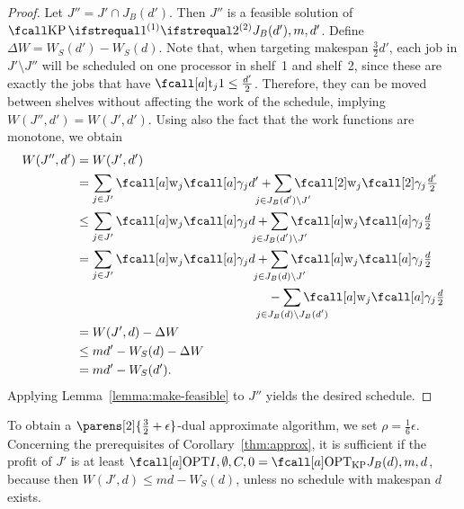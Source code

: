 \begin{proof}
  Let $J'' = J' \cap J_B(d')$.
  Then $J''$ is a feasible solution of $\KP{J_B(d')}{m,d'}$.
  Define $\Delta W = W_S(d') - W_S(d)$.
  Note that, when targeting makespan $\frac{3}{2}d'$,
  each job in $J' \setminus J''$ will be scheduled on one processor in shelf~1 and shelf~2,
  since these are exactly the jobs that have $\ptm{j}{1} \leq \frac{d'}{2}$.
  Therefore, they can be moved between shelves without affecting the work of the schedule,
  implying~$W(J'', d') = W(J', d')$.
  Using also the fact that the work functions are monotone, we obtain
  \begin{equation}
    \begin{aligned}
      W(J'', d') &= W(J', d') \\
      &= \sum_{j \in J'} \work{j}{\procnum{j}{d'}} + \sum_{\mathclap{j \in J_B(d') \setminus J'}} \work[2]{j}{\procnum[2]{j}{\textstyle\frac{d'}{2}}} \\
      &\leq \sum_{j \in J'} \work{j}{\procnum{j}{d}} + \sum_{\mathclap{j \in J_B(d') \setminus J'}} \work{j}{\procnum{j}{\textstyle\frac{d}{2}}} \\
      &\begin{multlined}
      = \sum_{j \in J'} \work{j}{\procnum{j}{d}} + \sum_{\mathclap{j \in J_B(d) \setminus J'}} \work{j}{\procnum{j}{\textstyle\frac{d}{2}}} \\
         - \sum_{\mathclap{j \in J_B(d) \setminus J_B(d')}} \work{j}{\procnum{j}{\textstyle\frac{d}{2}}} \end{multlined} \\
      &= W(J', d) - \Delta W \\
      &\leq md' - W_S(d) - \Delta W \\
      &= md' - W_S(d') \dpunct{.}
    \end{aligned}
  \end{equation}
  Applying Lemma~\ref{lemma:make-feasible} to $J''$ yields the desired schedule.
\end{proof}

To obtain a $\parens[2]{\frac{3}{2} + \epsilon}$-dual approximate algorithm,
we set $\rho = \frac{1}{6} \epsilon$.
Concerning the prerequisites of Corollary~\ref{thm:approx},
it is sufficient if the profit of $J'$ is at least $\KPCOPT{I, \emptyset, C, 0} = \KPOPT{J_B(d)}{m, d}$,
because then $W(J', d) \leq md - W_S(d)$, unless no schedule with makespan $d$ exists.

